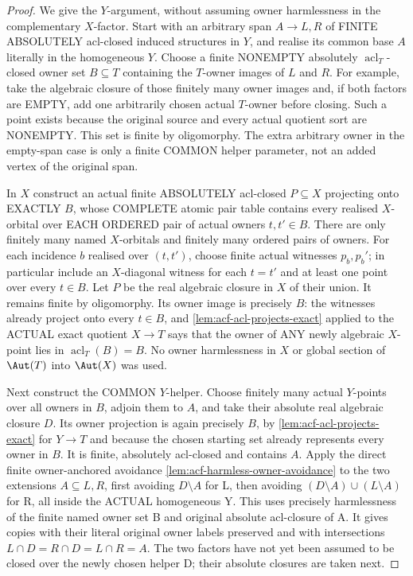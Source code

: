 \begin{proof}
We give the \(Y\)-argument, without assuming
owner harmlessness in the complementary
\(X\)-factor. Start with an arbitrary
span \(A\to L,R\) of FINITE ABSOLUTELY
acl-closed induced structures in \(Y\),
and realise its common base \(A\)
literally in the homogeneous \(Y\).
Choose a finite NONEMPTY absolutely
\(\operatorname{acl}_T\)-closed owner set
\(B\subseteq T\) containing the \(T\)-owner
images of \(L\) and \(R\).
For example, take the algebraic closure
of those finitely many owner images
and, if both factors are EMPTY, add
one arbitrarily chosen actual $T$-owner
before closing. Such a point exists
because the original source and every
actual quotient sort are NONEMPTY.
This set is finite by oligomorphy.
The extra arbitrary owner in the
empty-span case is only a finite
COMMON helper parameter, not an
added vertex of the original span.

In \(X\) construct an actual finite
ABSOLUTELY acl-closed
\(P\subseteq X\) projecting onto
EXACTLY \(B\), whose COMPLETE atomic
pair table contains every realised
\(X\)-orbital over EACH ORDERED pair
of actual owners \(t,t'\in B\).
There are only finitely many named
\(X\)-orbitals and finitely many
ordered pairs of owners. For each
incidence \(b\) realised over
\((t,t')\), choose finite actual
witnesses \(p_b,p_b'\); in particular
include an \(X\)-diagonal witness
for each \(t=t'\) and at least one
point over every \(t\in B\).
Let \(P\) be the real algebraic
closure in \(X\) of their union.
It remains finite by oligomorphy.
Its owner image is precisely \(B\):
the witnesses already project
onto every \(t\in B\), and
\cref{lem:acf-acl-projects-exact}
applied to the ACTUAL exact
quotient \(X\to T\) says that
the owner of ANY newly algebraic
\(X\)-point lies in
\(\operatorname{acl}_T(B)=B\).
No owner harmlessness in \(X\)
or global section of
\(\Aut(T)\) into \(\Aut(X)\)
was used.

Next construct the COMMON \(Y\)-helper.
Choose finitely many actual \(Y\)-points
over all owners in \(B\), adjoin them
to \(A\), and take their absolute
real algebraic closure \(D\).
Its owner projection is again
precisely \(B\), by
\cref{lem:acf-acl-projects-exact}
for \(Y\to T\) and because
the chosen starting set already
represents every owner in \(B\).
It is finite, absolutely
acl-closed and contains \(A\).
Apply the direct finite
owner-anchored avoidance
\cref{lem:acf-harmless-owner-avoidance}
to the two extensions
$A\subseteq L,R$,
first avoiding $D\setminus A$
for L, then avoiding
$(D\setminus A)\cup
(L\setminus A)$ for R,
all inside the ACTUAL
homogeneous Y.
This uses precisely
harmlessness of the
finite named owner set B
and original absolute
acl-closure of A.
It gives copies with
their literal original
owner labels preserved
and with intersections
$L\cap D=R\cap D=L\cap R=A$.
The two factors have
not yet been assumed
to be closed over
the newly chosen helper
D; their absolute
closures are taken next.


\end{proof}
